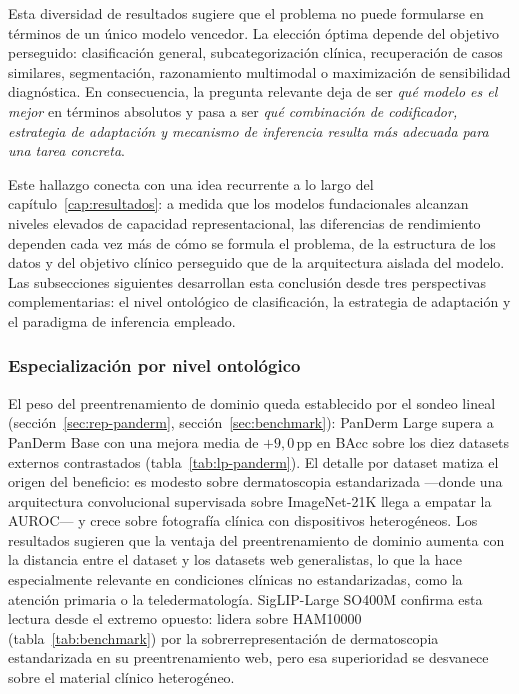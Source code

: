 Esta diversidad de resultados sugiere que el problema no puede
formularse en términos de un único modelo vencedor. La elección óptima
depende del objetivo perseguido: clasificación general, subcategorización
clínica, recuperación de casos similares, segmentación, razonamiento
multimodal o maximización de sensibilidad diagnóstica. En consecuencia,
la pregunta relevante deja de ser \emph{qué modelo es el mejor} en
términos absolutos y pasa a ser \emph{qué combinación de codificador,
estrategia de adaptación y mecanismo de inferencia resulta más adecuada
para una tarea concreta}.

Este hallazgo conecta con una idea recurrente a lo largo del
capítulo~\ref{cap:resultados}: a medida que los modelos fundacionales
alcanzan niveles elevados de capacidad representacional, las diferencias
de rendimiento dependen cada vez más de cómo se formula el problema, de
la estructura de los datos y del objetivo clínico perseguido que de la
arquitectura aislada del modelo. Las subsecciones siguientes desarrollan
esta conclusión desde tres perspectivas complementarias: el nivel
ontológico de clasificación, la estrategia de adaptación y el paradigma
de inferencia empleado.

\subsubsection{Especialización por nivel ontológico}
\label{sec:disc-nivel-ontologico}

El peso del preentrenamiento de dominio queda establecido por el
sondeo lineal (sección~\ref{sec:rep-panderm},
sección~\ref{sec:benchmark}): PanDerm Large supera a PanDerm Base con
una mejora media de $+9{,}0$\,pp en BAcc sobre los diez datasets
externos contrastados (tabla~\ref{tab:lp-panderm}). El detalle por
dataset matiza el origen del beneficio: es modesto sobre dermatoscopia
estandarizada ---donde una arquitectura convolucional supervisada
sobre ImageNet-21K llega a empatar la AUROC--- y crece sobre
fotografía clínica con dispositivos heterogéneos. Los resultados
sugieren que la ventaja del preentrenamiento de dominio aumenta con la
distancia entre el dataset y los datasets web generalistas, lo que la
hace especialmente relevante en condiciones clínicas no
estandarizadas, como la atención primaria o la teledermatología.
SigLIP-Large SO400M confirma esta lectura desde el extremo opuesto:
lidera sobre HAM10000 (tabla~\ref{tab:benchmark}) por la
sobrerrepresentación de dermatoscopia estandarizada en su
preentrenamiento web, pero esa superioridad se desvanece sobre el
material clínico heterogéneo.

